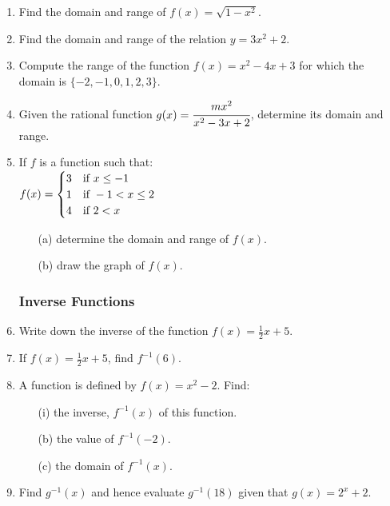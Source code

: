 \begin{enumerate}
	\item Find the domain and range of $f(x) = \sqrt{1 - x^2}$.
	
	\item Find the domain and range of the relation $y = 3x^2 + 2$.
	
	\item Compute the range of the function $f(x) = x^2 - 4x + 3$ for which the domain is $\{-2, -1, 0, 1, 2, 3\}$.
	
	\item Given the rational function $g(x) = \cfrac{mx^2}{x^2 - 3x + 2}$, determine its domain and range.
	
	\item If $f$ is a function such that:\\
	$f(x) =
	\begin{cases}
	\-3 & \text{if } x \leq -1 \\
	1 & \text{if } -1 < x \leq 2 \\
	4 & \text{if } 2 < x
	\end{cases}$
	
	\begin{itemize}
	\item[(a)] determine the domain and range of $f(x)$.
	\item[(b)] draw the graph of $f(x)$.
	\end{itemize}
	
			\subsubsection{Inverse Functions}
	\item Write down the inverse of the function $f(x) = \frac{1}{2}x + 5$.
	
	\item If $f(x) = \frac{1}{2}x + 5$, find $f^{-1}(6)$.
	
	\item A function is defined by $f(x) = x^2 - 2$. Find:
		\begin{itemize}
		\item[(i)] the inverse, $f^{-1}(x)$ of this function.
		\item[(b)] the value of $f^{-1}(-2)$.
		\item[(c)] the domain of $f^{-1}(x)$.
		\end{itemize}
		
	\item Find $g^{-1}(x)$ and hence evaluate $g^{-1}(18)$ given that $g(x) = 2^x + 2$.
	

\end{enumerate}
